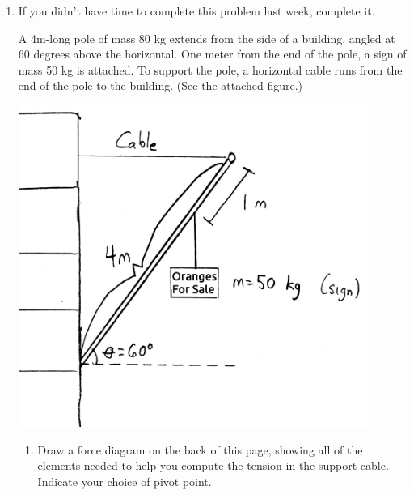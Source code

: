\documentclass[12pt]{article}
\begin{document}
\Large
\centerline{}
\normalsize
\centerline{}

\begin{enumerate}
\item If you didn't have time to complete this problem last week, complete it.

\begin{minipage}[b]{0.4\textwidth}
  \vspace{-2.8in}

A 4m-long pole of mass 80 kg extends from the side of a building, angled at 60 degrees above the horizontal. One meter from the end of the pole, a sign of mass 50 kg is attached. To support the pole,
a horizontal cable runs from the end of the pole to the building. (See the attached figure.)

\bigskip
\bigskip
\bigskip
\bigskip
\bigskip
\bigskip

\end{minipage}
\begin{minipage}[t]{0.6\textwidth}
  \begin{flushright}
  \includegraphics[width=0.9\textwidth]{sign2.jpg}
\end{flushright}
\end{minipage}

\bigskip
\bigskip

\begin{enumerate}
\item Draw a force diagram on the back of this page, showing all of the elements needed to help you compute the tension in the support cable. Indicate
your choice of pivot point.


\end{enumerate}
\end{enumerate}
\end{document}
